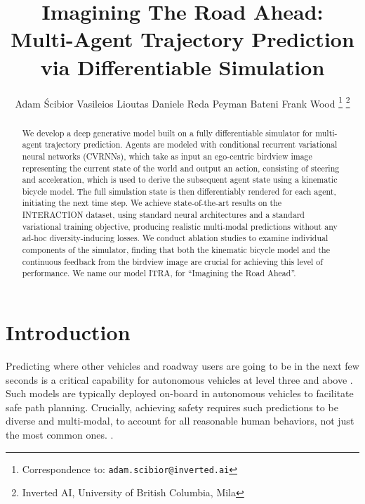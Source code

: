 \documentclass[letterpaper, 10 pt, conference]{ieeeconf}
\title{\LARGE \bf
Imagining The Road Ahead: \\
Multi-Agent Trajectory Prediction via Differentiable Simulation
}
\author{
Adam \'Scibior
Vasileios Lioutas
Daniele Reda
Peyman Bateni
Frank Wood
\thanks{Correspondence to: \texttt{adam.scibior@inverted.ai}}
\thanks{Inverted AI,
University of British Columbia,
Mila}
}
\begin{document}
\maketitle
\thispagestyle{empty}
\pagestyle{empty}



\begin{abstract}
We develop a deep generative model built on a fully differentiable simulator for multi-agent trajectory prediction. 
Agents are modeled with conditional recurrent variational neural networks (CVRNNs), which take as input an ego-centric birdview image representing the current state of the world and output an action, consisting of steering and acceleration, which is used to derive the subsequent agent state using a kinematic bicycle model. The full simulation state is then differentiably rendered for each agent, initiating the next time step. We achieve state-of-the-art results on the INTERACTION dataset, using standard neural architectures and a standard variational training objective, producing realistic multi-modal predictions without any ad-hoc diversity-inducing losses. We conduct ablation studies to examine individual components of the simulator, finding that both the kinematic bicycle model and the continuous feedback from the birdview image are crucial for achieving this level of performance. We name our model ITRA, for ``Imagining the Road Ahead''.
\end{abstract}


\section{Introduction}


Predicting where other vehicles and roadway users are going to be in the next few seconds is a critical capability for autonomous vehicles at level three and above \cite{noauthor_j3016b_nodate, boudette_despite_2019}. Such models are typically deployed on-board in autonomous vehicles to facilitate safe path planning. Crucially, achieving safety requires such predictions to be diverse and multi-modal, to account for all reasonable human behaviors, not just the most common ones. \cite{chai_multipath_2019, cui_multimodal_2019}.
\end{document}
